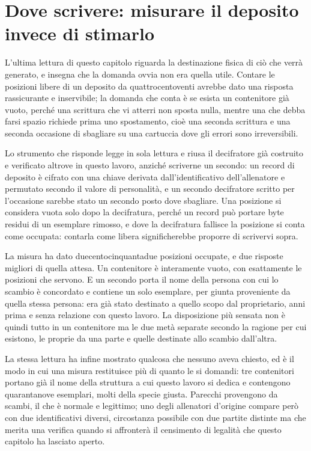 \section{Dove scrivere: misurare il deposito invece di stimarlo}

L'ultima lettura di questo capitolo riguarda la destinazione fisica di ciò che verrà generato, e insegna che la domanda ovvia non era quella utile. Contare le posizioni libere di un deposito da quattrocentoventi avrebbe dato una risposta rassicurante e inservibile; la domanda che conta è se esista un contenitore già vuoto, perché una scrittura che vi atterri non sposta nulla, mentre una che debba farsi spazio richiede prima uno spostamento, cioè una seconda scrittura e una seconda occasione di sbagliare su una cartuccia dove gli errori sono irreversibili.

Lo strumento che risponde legge in sola lettura e riusa il decifratore già costruito e verificato altrove in questo lavoro, anziché scriverne un secondo: un record di deposito è cifrato con una chiave derivata dall'identificativo dell'allenatore e permutato secondo il valore di personalità, e un secondo decifratore scritto per l'occasione sarebbe stato un secondo posto dove sbagliare. Una posizione si considera vuota solo dopo la decifratura, perché un record può portare byte residui di un esemplare rimosso, e dove la decifratura fallisce la posizione si conta come occupata: contarla come libera significherebbe proporre di scrivervi sopra.

La misura ha dato duecentocinquantadue posizioni occupate, e due risposte migliori di quella attesa. Un contenitore è interamente vuoto, con esattamente le posizioni che servono. E un secondo porta il nome della persona con cui lo scambio è concordato e contiene un solo esemplare, per giunta proveniente da quella stessa persona: era già stato destinato a quello scopo dal proprietario, anni prima e senza relazione con questo lavoro. La disposizione più sensata non è quindi tutto in un contenitore ma le due metà separate secondo la ragione per cui esistono, le proprie da una parte e quelle destinate allo scambio dall'altra.

La stessa lettura ha infine mostrato qualcosa che nessuno aveva chiesto, ed è il modo in cui una misura restituisce più di quanto le si domandi: tre contenitori portano già il nome della struttura a cui questo lavoro si dedica e contengono quarantanove esemplari, molti della specie giusta. Parecchi provengono da scambi, il che è normale e legittimo; uno degli allenatori d'origine compare però con due identificativi diversi, circostanza possibile con due partite distinte ma che merita una verifica quando si affronterà il censimento di legalità che questo capitolo ha lasciato aperto.

